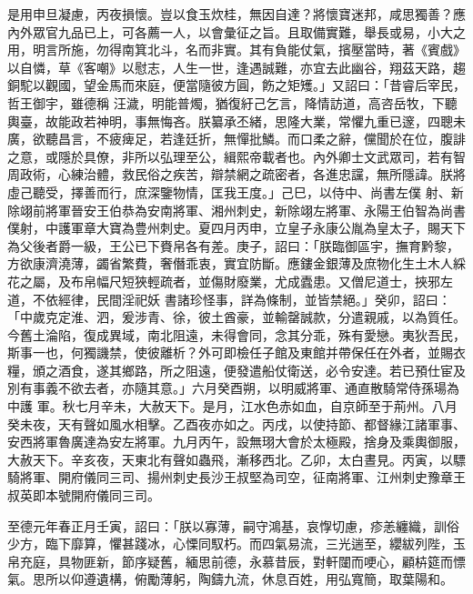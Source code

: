 \begin{pinyinscope}
 是用申旦凝慮，丙夜損懷。豈以食玉炊桂，無因自達？將懷寶迷邦，咸思獨善？應內外眾官九品已上，可各薦一人，以會彙征之旨。且取備實難，舉長或易，小大之用，明言所施，勿得南箕北斗，名而非實。其有負能仗氣，擯壓當時，著《賓戲》以自憐，草《客嘲》以慰志，人生一世，逢遇誠難，亦宜去此幽谷，翔茲天路，趨銅駝以觀國，望金馬而來庭，便當隨彼方圓，飭之矩矱。」又詔曰：「昔睿后宰民，哲王御宇，雖德稱
 汪濊，明能普燭，猶復紆己乞言，降情訪道，高咨岳牧，下聽輿臺，故能政若神明，事無悔吝。朕纂承丕緒，思隆大業，常懼九重已邃，四聰未廣，欲聽昌言，不疲痺足，若逢廷折，無憚批鱗。而口柔之辭，儻聞於在位，腹誹之意，或隱於具僚，非所以弘理至公，緝熙帝載者也。內外卿士文武眾司，若有智周政術，心練治體，救民俗之疾苦，辯禁網之疏密者，各進忠讜，無所隱諱。朕將虛己聽受，擇善而行，庶深鑒物情，匡我王度。」己巳，以侍中、尚書左僕
 射、新除翊前將軍晉安王伯恭為安南將軍、湘州刺史，新除翊左將軍、永陽王伯智為尚書僕射，中護軍章大寶為豊州刺史。夏四月丙申，立皇子永康公胤為皇太子，賜天下為父後者爵一級，王公已下賚帛各有差。庚子，詔曰：「朕臨御區宇，撫育黔黎，方欲康濟澆薄，蠲省繁費，奢僭乖衷，實宜防斷。應鏤金銀薄及庶物化生土木人綵花之屬，及布帛幅尺短狹輕疏者，並傷財廢業，尤成蠹患。又僧尼道士，挾邪左道，不依經律，民間淫祀妖
 書諸珍怪事，詳為條制，並皆禁絕。」癸卯，詔曰：「中歲克定淮、泗，爰涉青、徐，彼土酋豪，並輸罄誠款，分遣親戚，以為質任。今舊土淪陷，復成異域，南北阻遠，未得會同，念其分乖，殊有愛戀。夷狄吾民，斯事一也，何獨譏禁，使彼離析？外可即檢任子館及東館并帶保任在外者，並賜衣糧，頒之酒食，遂其鄉路，所之阻遠，便發遣船仗衛送，必令安達。若已預仕宦及別有事義不欲去者，亦隨其意。」六月癸酉朔，以明威將軍、通直散騎常侍孫瑒為中護
 軍。秋七月辛未，大赦天下。是月，江水色赤如血，自京師至于荊州。八月癸未夜，天有聲如風水相擊。乙酉夜亦如之。丙戌，以使持節、都督緣江諸軍事、安西將軍魯廣達為安左將軍。九月丙午，設無珝大會於太極殿，捨身及乘輿御服，大赦天下。辛亥夜，天東北有聲如蟲飛，漸移西北。乙卯，太白晝見。丙寅，以驃騎將軍、開府儀同三司、揚州刺史長沙王叔堅為司空，征南將軍、江州刺史豫章王叔英即本號開府儀同三司。



 至德元年春正月壬寅，詔曰：「朕以寡薄，嗣守鴻基，哀惸切慮，疹恙纏織，訓俗少方，臨下靡算，懼甚踐冰，心慄同馭朽。而四氣易流，三光遄至，纓紱列陛，玉帛充庭，具物匪新，節序疑舊，緬思前德，永慕昔辰，對軒闥而哽心，顧枿筵而慓氣。思所以仰遵遺構，俯勵薄躬，陶鑄九流，休息百姓，用弘寬簡，取葉陽和。




\end{pinyinscope}
